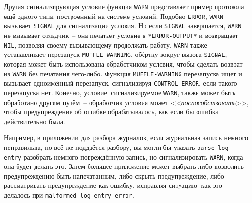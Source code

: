 Другая сигнализирующая условие функция \lstinline{WARN} представляет пример протокола ещё
одного типа, построенный на системе условий. Подобно \lstinline{ERROR}, \lstinline{WARN}
вызывает \lstinline{SIGNAL} для сигнализации условия. Но если \lstinline{SIGNAL}
завершается, \lstinline{WARN} не вызывает отладчик~-- она печатает условие в
\lstinline{*ERROR-OUTPUT*} и возвращает \lstinline{NIL}, позволяя своему вызывающему
продолжать работу. \lstinline{WARN} также устанавливает перезапуск
\lstinline{MUFFLE-WARNING}, обёртку вокруг вызова \lstinline{SIGNAL}, которая может быть
использована обработчиком условия, чтобы сделать возврат из \lstinline{WARN} без печатания
чего-либо. Функция \lstinline{MUFFLE-WARNING} перезапуска ищет и вызывает одноимённый
перезапуск, сигнализируя \lstinline{CONTROL-ERROR}, если такого перезапуска нет. Конечно,
условие, сигнализируемое \lstinline{WARN}, также может быть обработано другим путём~--
обработчик условия может <<\textit{поспособствовать}>>, чтобы предупреждение об ошибке
обрабатывалось, как если бы ошибка действительно была.


Например, в приложении для разбора журналов, если журнальная запись немного неправильна, но
всё же поддаётся разбору, вы могли бы указать \lstinline{parse-log-entry} разобрать немного
повреждённую запись, но сигнализировать \lstinline{WARN}, когда она будет делать это. Затем
большее приложение может выбрать либо позволить предупреждению быть напечатанным, либо
скрыть предупреждение, либо рассматривать предупреждение как ошибку, исправляя ситуацию,
как это делалось при \lstinline{malformed-log-entry-error}.


